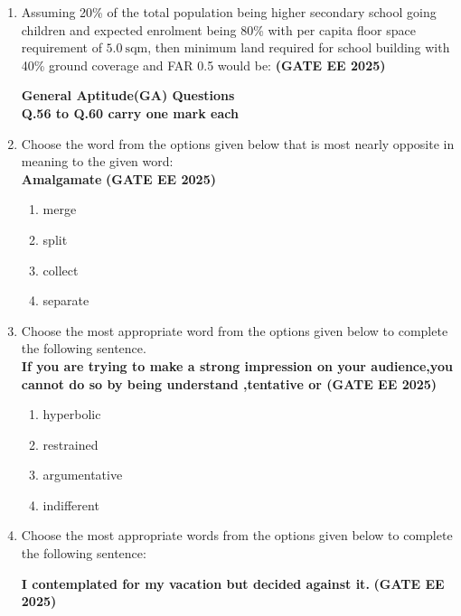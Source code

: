 \documentclass[journal,12pt,onecolumn]{IEEEtran}
\theoremstyle{remark}
\begin{document}
{\begin{enumerate}
\item Assuming 20\% of the total population being higher secondary school going children and expected enrolment being 80\% with per capita floor space requirement of $5.0\ \text{sqm}$, then minimum land required for school building with 40\% ground coverage and FAR 0.5 would be: \hfill \textbf{(GATE EE 2025)}
\begin{enumerate}
\end{enumerate}
\textbf{General Aptitude(GA) Questions} \\
\textbf{Q.56 to Q.60 carry one mark each}
\item Choose the word from the options given below that is most nearly opposite in meaning to the given word: \\
\textbf{Amalgamate} \hfill \textbf{(GATE EE 2025)}
\begin{enumerate}
    \item merge
    \item split
    \item collect
    \item separate
\end{enumerate}
\item Choose the most appropriate word from the options given below to complete the following sentence.\\
\textbf{If you are trying to make a strong impression on your audience,you cannot do so by being understand ,tentative or \underline{\makebox[2cm]{\hfill}} } \hfill \textbf{(GATE EE 2025)}
\begin{enumerate}
    \item hyperbolic
    \item restrained
    \item argumentative
    \item indifferent
\end{enumerate}

\item  Choose the most appropriate words from the options given below to complete the following sentence:

\textbf{I contemplated \underline{\makebox[2cm]{\hfill}} for my vacation but decided against it.} \hfill \textbf{(GATE EE 2025)}


\end{enumerate}}
\end{document}
